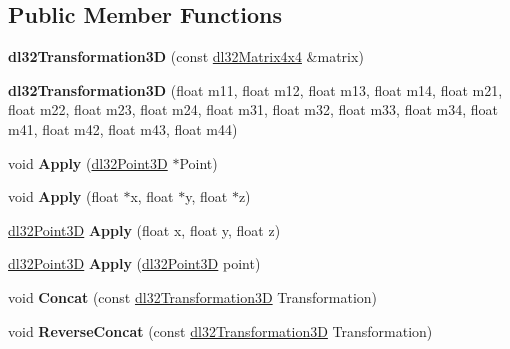 \subsection*{Public Member Functions}
\begin{DoxyCompactItemize}
\item 
\hypertarget{classdl32_transformation3_d_a9270b90c06cb890a326756930e3f50bb}{{\bfseries dl32\-Transformation3\-D} (const \hyperlink{structdl32_matrix4x4}{dl32\-Matrix4x4} \&matrix)}\label{classdl32_transformation3_d_a9270b90c06cb890a326756930e3f50bb}

\item 
\hypertarget{classdl32_transformation3_d_a389b399df682477560da0fb139f50d52}{{\bfseries dl32\-Transformation3\-D} (float m11, float m12, float m13, float m14, float m21, float m22, float m23, float m24, float m31, float m32, float m33, float m34, float m41, float m42, float m43, float m44)}\label{classdl32_transformation3_d_a389b399df682477560da0fb139f50d52}

\item 
\hypertarget{classdl32_transformation3_d_aade8b767bfe4b6689783b0fd132076a3}{void {\bfseries Apply} (\hyperlink{structdl32_point3_d}{dl32\-Point3\-D} $\ast$Point)}\label{classdl32_transformation3_d_aade8b767bfe4b6689783b0fd132076a3}

\item 
\hypertarget{classdl32_transformation3_d_a67f45b3add8bd4a511d62af15a9e48bb}{void {\bfseries Apply} (float $\ast$x, float $\ast$y, float $\ast$z)}\label{classdl32_transformation3_d_a67f45b3add8bd4a511d62af15a9e48bb}

\item 
\hypertarget{classdl32_transformation3_d_a1f69969d534b86215e43ac545471ed97}{\hyperlink{structdl32_point3_d}{dl32\-Point3\-D} {\bfseries Apply} (float x, float y, float z)}\label{classdl32_transformation3_d_a1f69969d534b86215e43ac545471ed97}

\item 
\hypertarget{classdl32_transformation3_d_a47441dc7c99f66a26e8dec07f994e938}{\hyperlink{structdl32_point3_d}{dl32\-Point3\-D} {\bfseries Apply} (\hyperlink{structdl32_point3_d}{dl32\-Point3\-D} point)}\label{classdl32_transformation3_d_a47441dc7c99f66a26e8dec07f994e938}

\item 
\hypertarget{classdl32_transformation3_d_a2b204a8ced0ffe7b3551e998a0ef84de}{void {\bfseries Concat} (const \hyperlink{classdl32_transformation3_d}{dl32\-Transformation3\-D} Transformation)}\label{classdl32_transformation3_d_a2b204a8ced0ffe7b3551e998a0ef84de}

\item 
\hypertarget{classdl32_transformation3_d_a7e723fa206b43b527c7de96af234d7b9}{void {\bfseries Reverse\-Concat} (const \hyperlink{classdl32_transformation3_d}{dl32\-Transformation3\-D} Transformation)}\label{classdl32_transformation3_d_a7e723fa206b43b527c7de96af234d7b9}

\end{DoxyCompactItemize}
